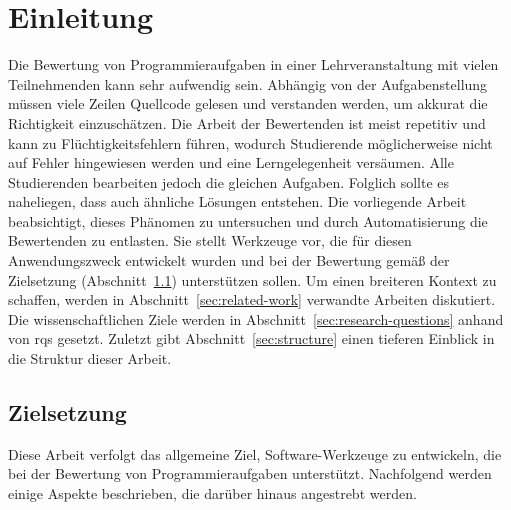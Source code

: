 \chapter{Einleitung}\label{ch:introduction}

Die Bewertung von Programmieraufgaben in einer Lehrveranstaltung mit vielen Teilnehmenden kann sehr aufwendig sein.
Abhängig von der Aufgabenstellung müssen viele Zeilen Quellcode gelesen und verstanden werden, um akkurat die Richtigkeit einzuschätzen.
Die Arbeit der Bewertenden ist meist repetitiv und kann zu Flüchtigkeitsfehlern führen, wodurch Studierende möglicherweise nicht auf Fehler hingewiesen werden und eine Lerngelegenheit versäumen.
Alle Studierenden bearbeiten jedoch die gleichen Aufgaben.
Folglich sollte es naheliegen, dass auch ähnliche Lösungen entstehen.
Die vorliegende Arbeit beabsichtigt, dieses Phänomen zu untersuchen und durch Automatisierung die Bewertenden zu entlasten.
Sie stellt Werkzeuge vor, die für diesen Anwendungszweck entwickelt wurden und bei der Bewertung gemäß der Zielsetzung (Abschnitt~\ref{sec:goals}) unterstützen sollen.
Um einen breiteren Kontext zu schaffen, werden in Abschnitt~\ref{sec:related-work} verwandte Arbeiten diskutiert.
Die wissenschaftlichen Ziele werden in Abschnitt~\ref{sec:research-questions} anhand von \acp{rq} gesetzt.
Zuletzt gibt Abschnitt~\ref{sec:structure} einen tieferen Einblick in die Struktur dieser Arbeit.

\section{Zielsetzung}\label{sec:goals}

Diese Arbeit verfolgt das allgemeine Ziel, Software-Werkzeuge zu entwickeln, die bei der Bewertung von Programmieraufgaben unterstützt.
Nachfolgend werden einige Aspekte beschrieben, die darüber hinaus angestrebt werden.

